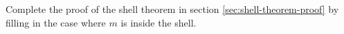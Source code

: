 Complete the proof of the shell theorem in section \ref{sec:shell-theorem-proof}
by filling in the case where $m$ is inside the shell.
